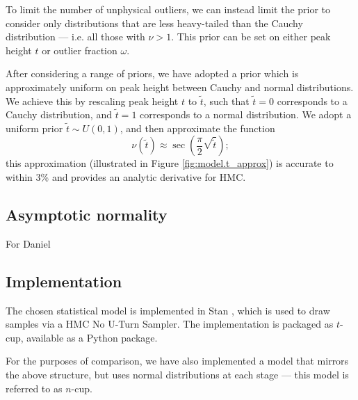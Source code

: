 \documentclass[fleqn,usenatbib]{mnras}
\begin{document}
To limit the number of unphysical outliers, we can instead limit the prior to
consider only distributions that are less heavy-tailed than the Cauchy
distribution --- i.e. all those with $\nu > 1$. This prior can be set on either
peak height $t$ or outlier fraction $\omega$.


After considering a range of priors, we have adopted a prior which is
approximately uniform on peak height between Cauchy and normal distributions.
We achieve this by rescaling peak height $t$ to $\tilde{t}$, such that
$\tilde{t} = 0$ corresponds to a Cauchy distribution, and $\tilde{t} = 1$
corresponds to a normal distribution. We adopt a uniform prior $\tilde{t} \sim
U\left(0, 1\right)$, and then approximate the function
\begin{equation}
    \nu\left(\tilde{t}\right)
        \approx
    \sec \left(\frac{\pi}{2} \sqrt{\tilde{t}} \right);
    \label{eqn:model.t_approx}
\end{equation}
this approximation (illustrated in Figure \ref{fig:model.t_approx}) is accurate
to within 3\% and provides an analytic derivative for HMC.

\subsection{Asymptotic normality}
\label{sec:formalism.asymptotic}

{\color{green} For Daniel}

\subsection{Implementation}
\label{sec:formalism.implementation}

The chosen statistical model is implemented in Stan \citep{Stan}, which is used
to draw samples via a HMC No U-Turn Sampler. The implementation is packaged as
$t$-cup, available as a Python package\footnotemark.

For the purposes of comparison, we have also implemented a model that mirrors
the above structure, but uses normal distributions at each stage --- this model
is referred to as $n$-cup.
\end{document}
